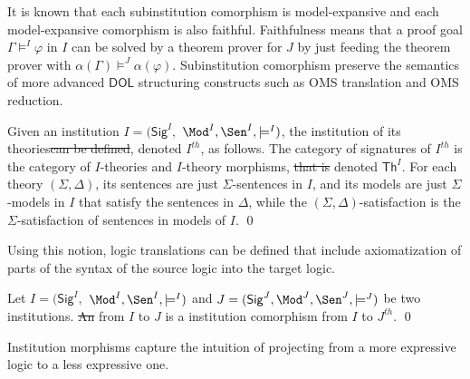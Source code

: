 \documentclass[10pt,fleqn,final]{scrreprt}
\newcommand{\Sig}{\mathsf{Sig}}
\renewcommand{\Th}{\mathsf{Th}}
\newcommand*{\DOL}{\ensuremath{\mathsf{DOL}}\xspace}
\providecommand{\DIFadd}[1]{{\protect\color{blue}\uwave{#1}}} %
\providecommand{\DIFdel}[1]{{\protect\color{red}\sout{#1}}}                      %
\providecommand{\DIFaddbegin}{} %
\providecommand{\DIFaddend}{} %
\providecommand{\DIFdelbegin}{} %
\providecommand{\DIFdelend}{} %
\begin{document}
It is known that each subinstitution comorphism is model-expansive and 
each model-expansive comorphism
is also faithful.
Faithfulness means that a proof goal $\Gamma\models^I\varphi$
in $I$ can be solved by a theorem prover for $J$ by just feeding the
theorem prover with $\alpha(\Gamma)\models^J\alpha(\varphi)$.
Subinstitution comorphism preserve
the semantics of more advanced \DOL structuring constructs such
as OMS translation and OMS reduction.


\begin{definition}
  Given an institution  $I = (\Sig^I,$ $ \Mod^I, \Sen^I, \models^I)$, the
   institution of its theories\DIFdelbegin \DIFdel{can be defined}\DIFdelend , denoted $I^{th}$, \DIFaddbegin \DIFadd{can be defined }\DIFaddend as follows. The category of signatures of $I^{th}$ is the category
   of $I$-theories and $I$-theory morphisms, \DIFdelbegin \DIFdel{that  is }\DIFdelend denoted $\Th^I$.
   For each theory $(\Sigma, \Delta)$, its sentences are just $\Sigma$-sentences in $I$, and
   its models are just $\Sigma$-models in $I$ that satisfy the sentences in $\Delta$, while the
   $(\Sigma,\Delta)$-satisfaction is the $\Sigma$-satisfaction of sentences in models of $I$.
\qed \end{definition}

Using this notion, logic translations can be defined that include axiomatization of parts of the
syntax of the source logic into the target logic.

\begin{definition}

 Let $I = (\Sig^I,$ $ \Mod^I, \Sen^I, \models^I)$ and $J = (\Sig^J, \Mod^J,
\Sen^J, \models^J)$ be two institutions. \DIFdelbegin \DIFdel{An }\DIFdelend \DIFaddbegin \DIFadd{A }\DIFaddend {} from $I$ to
$J$ is a institution comorphism from $I$ to $J^{th}$.
\qed\end{definition}

\medskip

Institution morphisms capture the intuition of projecting from a more expressive logic to a less expressive one.
\end{document}
